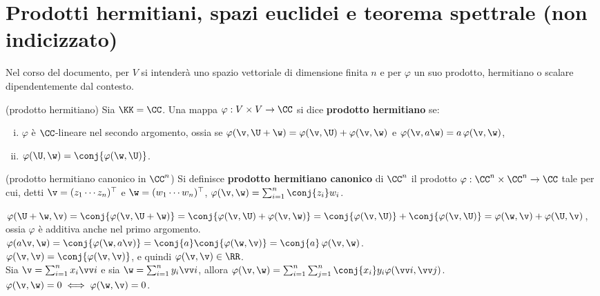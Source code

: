\chapter{Prodotti hermitiani, spazi euclidei e teorema spettrale (non indicizzato)}

\begin{note}
	Nel corso del documento, per $V$ si intenderà uno spazio vettoriale di dimensione
	finita $n$ e per $\varphi$ un suo prodotto, hermitiano o scalare
	dipendentemente dal contesto.
\end{note}

\begin{definition} (prodotto hermitiano) Sia $\KK = \CC$. Una mappa $\varphi : V \times V \to \CC$ si dice \textbf{prodotto hermitiano} se:
	
	\begin{enumerate}[(i)]
		\item $\varphi$ è $\CC$-lineare nel secondo argomento, ossia se $\varphi(\v, \U + \w) = \varphi(\v, \U) + \varphi(\v, \w)$ e
		$\varphi(\v, a \w) = a \, \varphi(\v, \w)$,
		\item $\varphi(\U, \w) = \conj{\varphi(\w, \U)}$.
	\end{enumerate}
\end{definition}

\begin{definition} (prodotto hermitiano canonico in $\CC^n$) Si definisce
	\textbf{prodotto hermitiano canonico} di $\CC^n$ il prodotto $\varphi : \CC^n \times \CC^n \to \CC$ tale per cui, detti $\v = (z_1 \cdots z_n)^\top$ e $\w = (w_1 \cdots w_n)^\top$, $\varphi(\v, \w) = \sum_{i=1}^n \conj{z_i} w_i$.
\end{definition}

\begin{remark}\nl
	\li $\varphi(\U + \w, \v) = \conj{\varphi(\v, \U + \w)} =
	\conj{\varphi(\v, \U) + \varphi(\v, \w)} = \conj{\varphi(\v, \U)} + \conj{\varphi(\v, \U)} = \varphi(\w, \v) + \varphi(\U, \v)$, ossia
	$\varphi$ è additiva anche nel primo argomento. \\
	\li $\varphi(a \v, \w) = \conj{\varphi(\w, a \v)} = \conj{a} \conj{\varphi(\w, \v)} = \conj{a} \, \varphi(\v, \w)$. \\
	\li $\varphi(\v, \v) = \conj{\varphi(\v, \v)}$, e quindi $\varphi(\v, \v) \in \RR$. \\
	\li Sia $\v = \sum_{i=1}^n x_i \vv i$ e sia $\w = \sum_{i=1}^n y_i \vv i$, allora $\varphi(\v, \w) = \sum_{i =1}^n \sum_{j=1}^n \conj{x_i} y_i \varphi(\vv i, \vv j)$. \\
	\li $\varphi(\v, \w) = 0 \iff \varphi(\w, \v) = 0$.
\end{remark}

